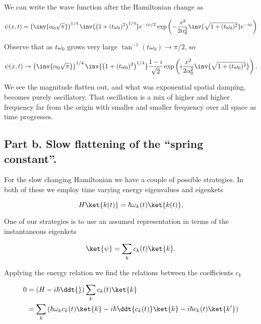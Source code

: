 We can write the wave function after the Hamiltonian change as

\begin{equation}\label{eqn:qmTwoExamReflection:310b}
\psi(x, t) = 
\left( \inv{\alpha_0 \sqrt{\pi}} \right)^{1/4}
\inv{\left( 1 + (t \omega_0)^2 \right)^{1/4}}
e^{-i \phi/2}
\exp\left(
-\frac{x^2}{2 \alpha_0^2} \inv{\sqrt{1 + (t \omega_0)^2}} e^{-i \phi}
\right)
\end{equation}

Observe that as $t \omega_0$ grows very large $\tan^{-1}(t \omega_0) \rightarrow \pi/2$, so 

\begin{equation}\label{eqn:qmTwoExamReflection:310c}
\psi(x, t) \rightarrow
\left( \inv{\alpha_0 \sqrt{\pi}} \right)^{1/4}
\inv{\left( 1 + (t \omega_0)^2 \right)^{1/4}}
\frac{1 - i}{\sqrt{2}}
\exp\left(
i\frac{x^2}{2 \alpha_0^2} \inv{\sqrt{1 + (t \omega_0)^2}} 
\right).
\end{equation}

We see the magnitude flatten out, and what was exponential spatial damping, becomes purely oscillatory.  That oscillation is a mix of higher and higher frequency far from the origin with smaller and smaller frequency over all space as time progresses.

\subsection{Part b.  Slow flattening of the ``spring constant''.}

For the slow changing Hamiltonian we have a couple of possible strategies.  In both of these we employ time varying energy eigenvalues and eigenkets

\begin{equation}\label{eqn:qmTwoExamReflection:n}
H \ket{k(t)} = \hbar \omega_k(t) \ket{k(t)},
\end{equation}

One of our strategies is to use an assumed representation in terms of the instantaneous eigenkets

\begin{equation}\label{eqn:qmTwoExamReflection:n}
\ket{\psi} = \sum_k c_k(t) \ket{k}.
\end{equation}

Applying the energy relation we find the relations between the coefficients $c_k$

\begin{align*}
0 
&= \left( 
H - i \hbar \ddt{}
\right)
\sum_k c_k(t) \ket{k} 
\\
&= 
\sum_k 
\left(
\hbar \omega_k 
c_k(t) \ket{k} 
-i \hbar
\ddt{c_k(t)} \ket{k} 
-i \hbar
c_k(t) \ket{k'} 
\right)
\end{align*}

